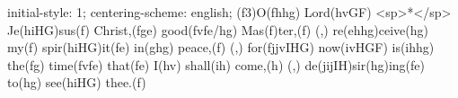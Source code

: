 initial-style: 1;
centering-scheme: english;
(f3)O(fhhg) Lord(hvGF) <sp>*</sp> Je(hiHG)sus(f) Christ,(fge) good(fvfe/hg) Mas(f)ter,(f) (,) re(ehhg)ceive(hg) my(f) spir(hiHG)it(fe) in(ghg) peace,(f) (,) for(fjjvIHG) now(ivHGF) is(ihhg) the(fg) time(fvfe) that(fe) I(hv) shall(ih) come,(h) (,) de(jijIH)sir(hg)ing(fe) to(hg) see(hiHG) thee.(f)
